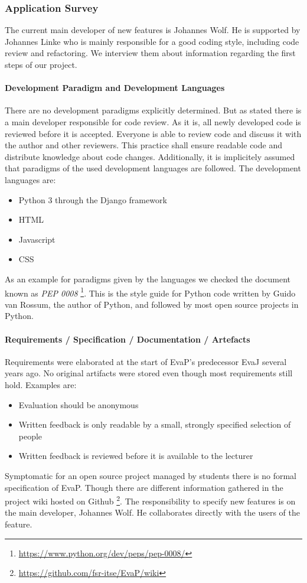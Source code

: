 \subsubsection{Application Survey}
The current main developer of new features is Johannes Wolf. 
He is supported by Johannes Linke who is mainly responsible for a good coding style, including code review and refactoring. 
We interview them about information regarding the first steps of our project.

\paragraph{Development Paradigm and Development Languages}
There are no development paradigms explicitly determined.
But as stated there is a main developer responsible for code review.
As it is, all newly developed code is reviewed before it is accepted.
Everyone is able to review code and discuss it with the author and other reviewers.
This practice shall ensure readable code and distribute knowledge about code changes.
Additionally, it is implicitely assumed that paradigms of the used development languages are followed.
The development languages are:
\begin{itemize}
    \item Python 3 through the Django framework
    \item HTML
    \item Javascript
    \item CSS
\end{itemize}
As an example for paradigms given by the languages we checked the document known as \emph{PEP 0008}%
\footnote{\url{https://www.python.org/dev/peps/pep-0008/}}.
This is the style guide for Python code written by Guido van Rossum, the author of Python, and followed by most open source projects in Python.

\paragraph{Requirements / Specification / Documentation / Artefacts}
Requirements were elaborated at the start of EvaP's predecessor EvaJ several years ago.
No original artifacts were stored even though most requirements still hold. 
Examples are:
\begin{itemize}
    \item Evaluation should be anonymous
    \item Written feedback is only readable by a small, strongly specified selection of people
    \item Written feedback is reviewed before it is available to the lecturer
\end{itemize}
Symptomatic for an open source project managed by students there is no formal specification of EvaP. 
Though there are different information gathered in the project wiki hosted on Github%
\footnote{\url{https://github.com/fsr-itse/EvaP/wiki}}.
The responsibility to specify new features is on the main developer, Johannes Wolf.
He collaborates directly with the users of the feature.



